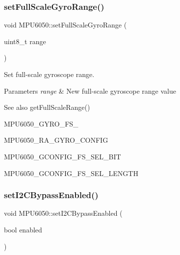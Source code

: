 \subsubsection{\texorpdfstring{setFullScaleGyroRange()}{setFullScaleGyroRange()}}
{\footnotesize\ttfamily void M\+P\+U6050\+::set\+Full\+Scale\+Gyro\+Range (\begin{DoxyParamCaption}\item[{uint8\+\_\+t}]{range }\end{DoxyParamCaption})}

Set full-\/scale gyroscope range. 
\begin{DoxyParams}{Parameters}
{\em range} & New full-\/scale gyroscope range value \\
\hline
\end{DoxyParams}
\begin{DoxySeeAlso}{See also}
get\+Full\+Scale\+Range() 

M\+P\+U6050\+\_\+\+G\+Y\+R\+O\+\_\+\+F\+S\+\_ 

M\+P\+U6050\+\_\+\+R\+A\+\_\+\+G\+Y\+R\+O\+\_\+\+C\+O\+N\+F\+IG 

M\+P\+U6050\+\_\+\+G\+C\+O\+N\+F\+I\+G\+\_\+\+F\+S\+\_\+\+S\+E\+L\+\_\+\+B\+IT 

M\+P\+U6050\+\_\+\+G\+C\+O\+N\+F\+I\+G\+\_\+\+F\+S\+\_\+\+S\+E\+L\+\_\+\+L\+E\+N\+G\+TH 
\end{DoxySeeAlso}
\mbox{\label{class_m_p_u6050_aa828160756a50f414aa3f5f5f0353c70}} 
\subsubsection{\texorpdfstring{setI2CBypassEnabled()}{setI2CBypassEnabled()}}
{\footnotesize\ttfamily void M\+P\+U6050\+::set\+I2\+C\+Bypass\+Enabled (\begin{DoxyParamCaption}\item[{bool}]{enabled }\end{DoxyParamCaption})}

